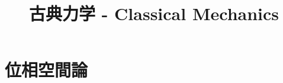 \documentclass[a4paper]{jsreport}
\title{古典力学 - Classical Mechanics}
\begin{document}
    \maketitle

    \tableofcontents

    \chapter{位相空間論}
\end{document}
